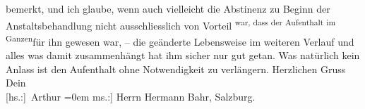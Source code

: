 \begin{ledgroupsized}[t]{13cm}
               bemerkt, und ich glaube, wenn auch vielleicht die \label{T_L02129-1v}\label{T_L02129-1h}
               Abstinenz zu Beginn der Anstaltsbehandlung nicht ausschliesslich von Vorteil \substVorne{}\textsuperscript{war, dass der Aufenthalt im Ganzen}{\allowbreak}\substDazwischen{}für ihn gewesen war\substHinten{}, – die geänderte Lebensweise im weiteren Verlauf und alles was damit
               zusammenhängt hat ihm sicher nur gut getan. Was natürlich kein Anlass ist den
               Aufenthalt ohne Notwendigkeit zu verlängern.\pend
           \pstart
           Herzlichen Gruss{\\[\baselineskip]}Dein{\\[\baselineskip]}\spacefill\mbox{{[}hs.:{]} Arthur}\pend
           \leftskip=0em{}\pstart
           \noindent{}{[}ms.:{]} Herrn Hermann Bahr, Salzburg.\pend
           
         
         \endnumbering{}\end{ledgroupsized}  \newcommand{\dateiname}{L02129}\newcommand{\titel}{Arthur Schnitzler an Hermann Bahr, 22. 4. 1913}\newcommand{\editorInnen}{ Kurt Ifkovits,  Martin Anton Müller}
      